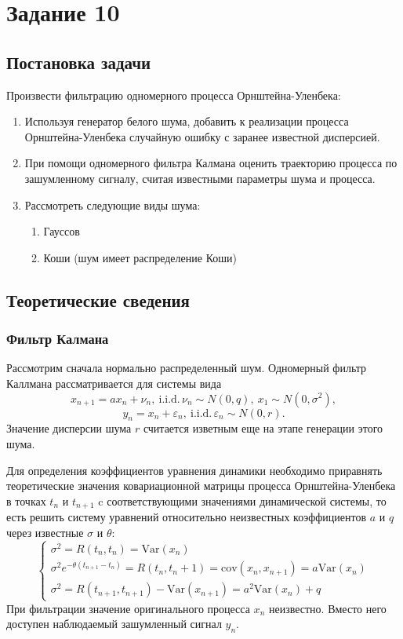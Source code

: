 \documentclass{article}
\theoremstyle{definition}
\begin{document}
\section{Задание 10}
\subsection{Постановка задачи}
Произвести фильтрацию одномерного процесса Орнштейна-Уленбека:
\begin{enumerate}
    \item Используя генератор белого шума, добавить к реализации процесса Орнштейна-Уленбека случайную ошибку с заранее известной дисперсией.
    \item При помощи одномерного фильтра Калмана оценить траекторию процесса по
    зашумленному сигналу, считая известными параметры шума и процесса.
    \item Рассмотреть следующие виды шума:
    \begin{enumerate}
        \item Гауссов
        \item Коши (шум имеет распределение Коши)
    \end{enumerate}
\end{enumerate}

\subsection{Теоретические сведения}

\subsubsection{Фильтр Калмана}

Рассмотрим сначала нормально распределенный шум. Одномерный фильтр Каллмана рассматривается для системы вида
$$x_{n + 1} = a x_n + \nu_n,\ \text{i.i.d.}\, \nu_n \sim N(0, q),\ x_1 \sim N(0, \sigma^2),$$
$$y_n = x_n + \varepsilon_n,\ \text{i.i.d.}\, \varepsilon_n \sim N(0, r).$$
Значение дисперсии шума $r$ считается изветным еще на этапе генерации этого шума.

Для определения коэффициентов уравнения динамики необходимо приравнять
теоретические значения ковариационной матрицы процесса Орнштейна-Уленбека в
точках $t_n$ и $t_{n+1}$ c соответствующими значениями динамической системы, то есть
решить систему уравнений относительно неизвестных коэффициентов $a$ и $q$ через известные $\sigma$ и $\theta$:
$$\begin{cases}
\sigma^2 = R(t_n, t_n) = \text{Var}(x_n)\\
\sigma^2e^{-\theta(t_{n+1} - t_n)} = R(t_n, t_n+1) = \text{cov}(x_n, x_{n + 1}) = a \text{Var}(x_n)\\
\sigma^2 = R(t_{n+1}, t_{n+1}) - \text{Var}(x_{n+1}) = a^2 \text{Var}(x_n) + q
\end{cases}$$
При фильтрации значение оригинального процесса $x_n$ неизвестно. Вместо него доступен наблюдаемый зашумленный сигнал $y_n$.
\end{document}
